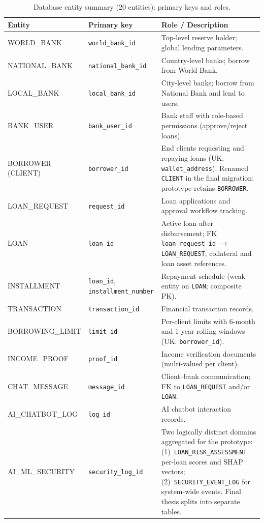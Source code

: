 \documentclass[12pt,a4paper]{report}
\newcommand{\tableheadcolor}{\rowcolor{TableHeadBg}}
\begin{document}
\begin{table}[H]
\centering
\caption[Database entity summary (20 entities)]{Database entity summary (20 entities): primary keys and roles.}
\label{tab:db-entities}
\small
\begin{tabular}{@{}p{2.6cm}p{3.4cm}p{7.0cm}@{}}
\toprule
\tableheadcolor
\textbf{Entity} & \textbf{Primary key} & \textbf{Role / Description} \\
\midrule
WORLD\_BANK & \texttt{world\_bank\_id} & Top-level reserve holder; global lending parameters. \\
NATIONAL\_BANK & \texttt{national\_bank\_id} & Country-level banks; borrow from World Bank. \\
LOCAL\_BANK & \texttt{local\_bank\_id} & City-level banks; borrow from National Bank and lend to users. \\
BANK\_USER & \texttt{bank\_user\_id} & Bank staff with role-based permissions (approve/reject loans). \\
BORROWER (CLIENT) & \texttt{borrower\_id} & End clients requesting and repaying loans (UK: \texttt{wallet\_address}). Renamed \texttt{CLIENT} in the final migration; prototype retains \texttt{BORROWER}. \\
LOAN\_REQUEST & \texttt{request\_id} & Loan applications and approval workflow tracking. \\
LOAN & \texttt{loan\_id} & Active loan after disbursement; FK \texttt{loan\_request\_id} $\to$ \texttt{LOAN\_REQUEST}; collateral and loan asset references. \\
INSTALLMENT & \texttt{loan\_id}, \texttt{installment\_number} & Repayment schedule (weak entity on \texttt{LOAN}; composite PK). \\
TRANSACTION & \texttt{transaction\_id} & Financial transaction records. \\
BORROWING\_LIMIT & \texttt{limit\_id} & Per-client limits with 6-month and 1-year rolling windows (UK: \texttt{borrower\_id}). \\
INCOME\_PROOF & \texttt{proof\_id} & Income verification documents (multi-valued per client). \\
CHAT\_MESSAGE & \texttt{message\_id} & Client--bank communication; FK to \texttt{LOAN\_REQUEST} and/or \texttt{LOAN}. \\
AI\_CHATBOT\_LOG & \texttt{log\_id} & AI chatbot interaction records. \\
AI\_ML\_SECURITY & \texttt{security\_log\_id} & Two logically distinct domains aggregated for the prototype: (1)~\texttt{LOAN\_RISK\_ASSESSMENT} per-loan scores and SHAP vectors; (2)~\texttt{SECURITY\_EVENT\_LOG} for system-wide events. Final thesis splits into separate tables. \\

\end{tabular}
\end{table}
\end{document}

